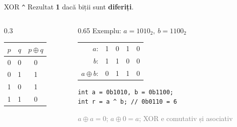 \documentclass{beamer}
\begin{document}
\begin{frame}[fragile]{XOR \textemdash{} \texttt{\textasciicircum}}
  Rezultat \textbf{1} dacă biții sunt \textbf{diferiți}.
  \bigskip
  \begin{columns}[T]
    \begin{column}{0.3\textwidth}
      \begin{center}
      \begin{tabular}{ccc}
        \toprule
        $p$ & $q$ & $p \oplus q$ \\
        \midrule
        0 & 0 & 0 \\
        0 & 1 & 1 \\
        1 & 0 & 1 \\
        1 & 1 & 0 \\
        \bottomrule
      \end{tabular}
      \end{center}
    \end{column}
    \begin{column}{0.65\textwidth}
      Exemplu: $a = 1010_2,\ b = 1100_2$
      \begin{center}
      \begin{tabular}{rcccc}
        $a$:            & 1 & 0 & 1 & 0 \\
        $b$:            & 1 & 1 & 0 & 0 \\
        \hline
        $a \oplus b$:   & 0 & 1 & 1 & 0 \\
      \end{tabular}
      \end{center}
      \begin{center}
      \begin{lstlisting}
int a = 0b1010, b = 0b1100;
int r = a ^ b; // 0b0110 = 6
      \end{lstlisting}
      \end{center}
      {\footnotesize\textcolor{gray}{$a \oplus a = 0$; \quad $a \oplus 0 = a$; \quad XOR e comutativ și asociativ}}
    \end{column}
  \end{columns}
\end{frame}
\end{document}
